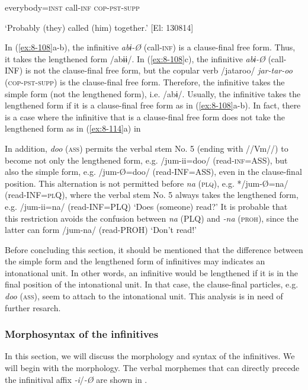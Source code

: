       everybody=\textsc{inst}  call-\textsc{inf}  \textsc{cop}-\textsc{pst}-\textsc{supp}

\glt ‘Probably (they) called (him) together.’ [El: 130814]

In (\ref{ex:8-108}a-b), the infinitive \textit{abɨ-Ø} (call-\textsc{inf}) is a clause-final free form. Thus, it takes the lengthened form /abɨɨ/. In (\ref{ex:8-108}c), the infinitive \textit{abɨ-Ø} (call-INF) is not the clause-final free form, but the copular verb /jataroo/ \textit{jar-tar-oo} (\textsc{cop}-\textsc{pst}-\textsc{supp}) is the clause-final free form. Therefore, the infinitive takes the simple form (not the lengthened form), i.e. /abɨ/. Usually, the infinitive takes the lengthened form if it is a clause-final free form as in (\ref{ex:8-108}a-b). In fact, there is a case where the infinitive that is a clause-final free form does not take the lengthened form as in (\ref{ex:8-114}a) in 

  In addition, \textit{doo} (\textsc{ass}) permits the verbal stem No. 5 (ending with //Vm//) to become not only the lengthened form, e.g. /jum-ii=doo/ (read-\textsc{inf}=ASS), but also the simple form, e.g. /jum-Ø=doo/ (read-INF=ASS), even in the clause-final position. This alternation is not permitted before \textit{na} (\textsc{plq}), e.g. */jum-Ø=na/ (read-INF=\textsc{pl}Q), where the verbal stem No. 5 always takes the lengthened form, e.g. /jum-ii=na/ (read-INF=PLQ) ‘Does (someone) read?’ It is probable that this restriction avoids the confusion between \textit{na} (PLQ) and \textit{{}-na} (\textsc{proh}), since the latter can form /jum-na/ (read-PROH) ‘Don’t read!’

  Before concluding this section, it should be mentioned that the difference between the simple form and the lengthened form of infinitives may indicates an intonational unit. In other words, an infinitive would be lengthened if it is in the final position of the intonational unit. In that case, the clause-final particles, e.g. \textit{doo} (\textsc{ass}), seem to attach to the intonational unit. This analysis is in need of further resarch.

\subsubsection{Morphosyntax of the infinitives}

In this section, we will discuss the morphology and syntax of the infinitives. We will begin with the morphology. The verbal morphemes that can directly precede the infinitival affix \textit{{}-i}/\textit{{}-Ø} are shown in .

